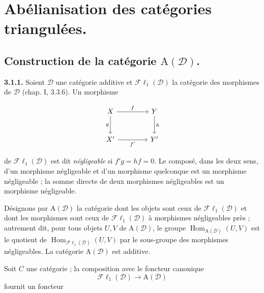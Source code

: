 \clearpage
{}%
\begingroup
\small
\setlength{\parskip}{0pt}%
\setlength{\emergencystretch}{1.5em}%

\section{Abélianisation des catégories triangulées.}

\subsection{Construction de la catégorie
\texorpdfstring{$\mathrm A(\mathcal D)$}{A(D)}.}

\noindent\textbf{3.1.1.}\quad
Soient $\mathcal D$ une catégorie additive et
$\mathcal{F}\ell_1(\mathcal D)$ la catégorie des morphismes de $\mathcal D$
(chap. I, 3.3.6). Un morphisme

\[
\begin{tikzcd}[column sep=4.2em,row sep=2.5em]
X \arrow[r,"f"] \arrow[d,"g"'] & Y \arrow[d,"h"] \\
X' \arrow[r,"f'"'] & Y'
\end{tikzcd}
\]

\noindent de $\mathcal{F}\ell_1(\mathcal D)$ est dit \emph{négligeable} si
$f'g=hf=0$. Le composé, dans les deux sens, d'un morphisme négligeable et
d'un morphisme quelconque est un morphisme négligeable ; la somme directe de
deux morphismes négligeables est un morphisme négligeable.

Désignons par $\mathrm A(\mathcal D)$ la catégorie dont les objets sont ceux de
$\mathcal{F}\ell_1(\mathcal D)$ et dont les morphismes sont ceux de
$\mathcal{F}\ell_1(\mathcal D)$ à morphismes négligeables près ; autrement
dit, pour tous objets $U,V$ de $\mathrm A(\mathcal D)$, le groupe
$\operatorname{Hom}_{\mathrm A(\mathcal D)}(U,V)$ est le quotient de
$\operatorname{Hom}_{\mathcal{F}\ell_1(\mathcal D)}(U,V)$ par le sous-groupe
des morphismes négligeables. La catégorie $\mathrm A(\mathcal D)$ est additive.

Soit $C$ une catégorie ; la composition avec le foncteur canonique
\[
\mathcal{F}\ell_1(\mathcal D)\longrightarrow\mathrm A(\mathcal D)
\]
fournit un foncteur


